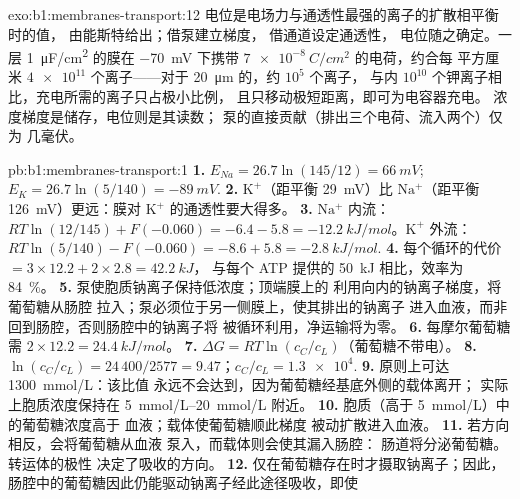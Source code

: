\begin{solution}{exo:b1:membranes-transport:12}
电位是电场力与通透性最强的离子的扩散相平衡时的值，
由能斯特给出；借泵建立梯度，
借通道设定通透性，
电位随之确定。一层 \qty{1}{\micro F/cm^2} 的膜在
\qty{-70}{mV} 下携带 $\qty{7e-8}{C/cm^2}$ 的电荷，约合每
平方厘米 $\num{4e11}$ 个离子——对于 \qty{20}{\micro m} 的，约 $10^5$ 个离子，
与内 $10^{10}$ 个钾离子相比，充电所需的离子只占极小比例，
且只移动极短距离，即可为电容器充电。
浓度梯度是储存，电位则是其读数；
泵的直接贡献（排出三个电荷、流入两个）仅为
几毫伏。
\end{solution}

\begin{solution}{pb:b1:membranes-transport:1}
\textbf{1.} $E_{Na} = 26.7\ln(145/12) = \qty{+66}{mV}$; $E_K =
26.7\ln(5/140) = \qty{-89}{mV}$.
\textbf{2.} $\mathrm{K^+}$（距平衡 \qty{29}{mV}）比
$\mathrm{Na^+}$（距平衡 \qty{126}{mV}）更远：膜对
$\mathrm{K^+}$ 的通透性要大得多。
\textbf{3.} $\mathrm{Na^+}$ 内流：$RT\ln(12/145) + F(-0.060) = -6.4 -
5.8 = \qty{-12.2}{kJ/mol}$。$\mathrm{K^+}$ 外流：$RT\ln(5/140) -
F(-0.060) = -8.6 + 5.8 = \qty{-2.8}{kJ/mol}$.
\textbf{4.} 每个循环的代价 $= 3\times 12.2 + 2\times 2.8 = \qty{42.2}{kJ}$，
与每个 ATP 提供的 \qty{50}{kJ} 相比，效率为 \qty{84}{\%}。
\textbf{5.} 泵使胞质钠离子保持低浓度；顶端膜上的
利用向内的钠离子梯度，将葡萄糖从肠腔
拉入；泵必须位于另一侧膜上，使其排出的钠离子
进入血液，而非回到肠腔，否则肠腔中的钠离子将
被循环利用，净运输将为零。
\textbf{6.} 每摩尔葡萄糖需 $2\times 12.2 = \qty{24.4}{kJ/mol}$。
\textbf{7.} $\Delta G = RT\ln(c_C/c_L)$（葡萄糖不带电）。
\textbf{8.} $\ln(c_C/c_L) = 24\,400/2577 = 9.47$；$c_C/c_L =
\num{1.3e4}$.
\textbf{9.} 原则上可达 \qty{1300}{mmol/L}：该比值
永远不会达到，因为葡萄糖经基底外侧的载体离开；
实际上胞质浓度保持在 \qtyrange{5}{20}{mmol/L} 附近。
\textbf{10.} 胞质（高于 \qty{5}{mmol/L}）中的葡萄糖浓度高于
血液；载体使葡萄糖顺此梯度
被动扩散进入血液。
\textbf{11.} 若方向相反，会将葡萄糖从血液
泵入，而载体则会使其漏入肠腔：
肠道将分泌葡萄糖。转运体的极性
决定了吸收的方向。
\textbf{12.} 仅在葡萄糖存在时才摄取钠离子；因此，
肠腔中的葡萄糖因此仍能驱动钠离子经此途径吸收，即使

\end{solution}
